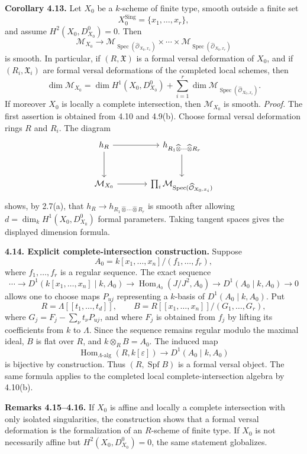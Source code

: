 \documentclass[11pt]{article}
\providecommand{\Spec}{\operatorname{Spec}}
\providecommand{\Hom}{\operatorname{Hom}}
\providecommand{\Spf}{\operatorname{Spf}}
\begin{document}
\textbf{Corollary 4.13.} Let \(X_0\) be a \(k\)-scheme of finite type, smooth outside a finite set
\[
 X_0^{\mathrm{Sing}}=\{x_1,\ldots,x_r\},
\]
and assume \(H^2(X_0,D^0_{X_0})=0\). Then
\[
 \mathcal M_{X_0}\to
 \mathcal M_{\Spec(\widehat{\mathcal O}_{X_0,x_1})}\times\cdots\times
 \mathcal M_{\Spec(\widehat{\mathcal O}_{X_0,x_r})}
\]
is smooth. In particular, if \((R,\mathfrak X)\) is a formal versal deformation of \(X_0\), and if \((R_i,\mathfrak X_i)\) are formal versal deformations of the completed local schemes, then
\[
 \dim \mathcal M_{X_0}
 =\dim H^1(X_0,D^0_{X_0})+
 \sum_{i=1}^r \dim \mathcal M_{\Spec(\widehat{\mathcal O}_{X_0,x_i})}.
\]
If moreover \(X_0\) is locally a complete intersection, then \(\mathcal M_{X_0}\) is smooth.
\textit{Proof.} The first assertion is obtained from 4.10 and 4.9(b). Choose formal versal deformation rings \(R\) and \(R_i\). The diagram
\[
\begin{tikzcd}[column sep=large,row sep=large]
 h_R \arrow[r] \arrow[d] & h_{R_1\widehat\otimes\cdots\widehat\otimes R_r} \arrow[d]\\
 \mathcal M_{X_0} \arrow[r] & \prod_i\mathcal M_{\Spec(\widehat{\mathcal O}_{X_0,x_i})}
\end{tikzcd}
\]
shows, by 2.7(a), that \(h_R\to h_{R_1\widehat\otimes\cdots\widehat\otimes R_r}\) is smooth after allowing \(d=\dim_kH^1(X_0,D^0_{X_0})\) formal parameters. Taking tangent spaces gives the displayed dimension formula.

\textbf{4.14. Explicit complete-intersection construction.} Suppose
\[
 A_0=k[x_1,\ldots,x_n]/(f_1,\ldots,f_r),
\]
where \(f_1,\ldots,f_r\) is a regular sequence. The exact sequence
\[
 \cdots\to D^1(k[x_1,\ldots,x_n]\mid k,A_0)\to
 \Hom_{A_0}(J/J^2,A_0)\to D^1(A_0\mid k,A_0)\to0
\]
allows one to choose maps \(P_{
u j}\) representing a \(k\)-basis of \(D^1(A_0\mid k,A_0)\). Put
\[
 R=\Lambda[[t_1,\ldots,t_d]],\qquad
 B=R[[x_1,\ldots,x_n]]/(G_1,\ldots,G_r),
\]
where \(G_j=F_j-\sum_\nu t_\nu P_{
u j}\), and where \(F_j\) is obtained from \(f_j\) by lifting its coefficients from \(k\) to \(\Lambda\). Since the sequence remains regular modulo the maximal ideal, \(B\) is flat over \(R\), and \(k\otimes_RB=A_0\). The induced map
\[
 \Hom_{\Lambda\text{-alg}}(R,k[\varepsilon])\to D^1(A_0\mid k,A_0)
\]
is bijective by construction. Thus \((R,\Spf B)\) is a formal versal object. The same formula applies to the completed local complete-intersection algebra by 4.10(b).

\textbf{Remarks 4.15--4.16.} If \(X_0\) is affine and locally a complete intersection with only isolated singularities, the construction shows that a formal versal deformation is the formalization of an \(R\)-scheme of finite type. If \(X_0\) is not necessarily affine but \(H^2(X_0,D^0_{X_0})=0\), the same statement globalizes.
\end{document}
